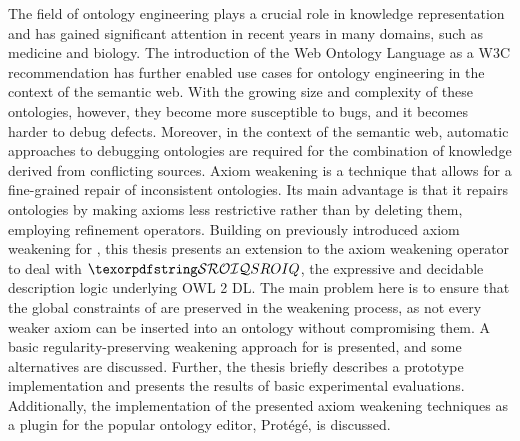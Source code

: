 The field of ontology engineering plays a crucial role in knowledge representation and has gained significant attention in recent years in many domains, such as medicine and biology. The introduction of the Web Ontology Language as a W3C recommendation has further enabled use cases for ontology engineering in the context of the semantic web. With the growing size and complexity of these ontologies, however, they become more susceptible to bugs, and it becomes harder to debug defects. Moreover, in the context of the semantic web, automatic approaches to debugging ontologies are required for the combination of knowledge derived from conflicting sources. Axiom weakening is a technique that allows for a fine-grained repair of inconsistent ontologies. Its main advantage is that it repairs ontologies by making axioms less restrictive rather than by deleting them, employing refinement operators. Building on previously introduced axiom weakening for \ALC, this thesis presents an extension to the axiom weakening operator to deal with $\SROIQ$, the expressive and decidable description logic underlying OWL 2 DL. The main problem here is to ensure that the global constraints of \SROIQ are preserved in the weakening process, as not every weaker axiom can be inserted into an ontology without compromising them. A basic regularity-preserving weakening approach for \SROIQ is presented, and some alternatives are discussed. Further, the thesis briefly describes a prototype implementation and presents the results of basic experimental evaluations. Additionally, the implementation of the presented axiom weakening techniques as a plugin for the popular ontology editor, Protégé, is discussed.
